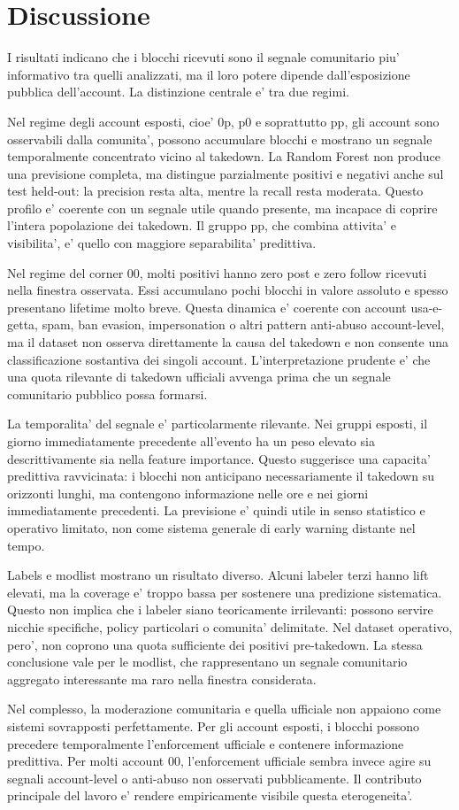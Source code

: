 \section{Discussione}

I risultati indicano che i blocchi ricevuti sono il segnale comunitario piu' informativo tra quelli analizzati, ma il loro potere dipende dall'esposizione pubblica dell'account. La distinzione centrale e' tra due regimi.

Nel regime degli account esposti, cioe' 0p, p0 e soprattutto pp, gli account sono osservabili dalla comunita', possono accumulare blocchi e mostrano un segnale temporalmente concentrato vicino al takedown. La Random Forest non produce una previsione completa, ma distingue parzialmente positivi e negativi anche sul test held-out: la precision resta alta, mentre la recall resta moderata. Questo profilo e' coerente con un segnale utile quando presente, ma incapace di coprire l'intera popolazione dei takedown. Il gruppo pp, che combina attivita' e visibilita', e' quello con maggiore separabilita' predittiva.

Nel regime del corner 00, molti positivi hanno zero post e zero follow ricevuti nella finestra osservata. Essi accumulano pochi blocchi in valore assoluto e spesso presentano lifetime molto breve. Questa dinamica e' coerente con account usa-e-getta, spam, ban evasion, impersonation o altri pattern anti-abuso account-level, ma il dataset non osserva direttamente la causa del takedown e non consente una classificazione sostantiva dei singoli account. L'interpretazione prudente e' che una quota rilevante di takedown ufficiali avvenga prima che un segnale comunitario pubblico possa formarsi.

La temporalita' del segnale e' particolarmente rilevante. Nei gruppi esposti, il giorno immediatamente precedente all'evento ha un peso elevato sia descrittivamente sia nella feature importance. Questo suggerisce una capacita' predittiva ravvicinata: i blocchi non anticipano necessariamente il takedown su orizzonti lunghi, ma contengono informazione nelle ore e nei giorni immediatamente precedenti. La previsione e' quindi utile in senso statistico e operativo limitato, non come sistema generale di early warning distante nel tempo.

Labels e modlist mostrano un risultato diverso. Alcuni labeler terzi hanno lift elevati, ma la coverage e' troppo bassa per sostenere una predizione sistematica. Questo non implica che i labeler siano teoricamente irrilevanti: possono servire nicchie specifiche, policy particolari o comunita' delimitate. Nel dataset operativo, pero', non coprono una quota sufficiente dei positivi pre-takedown. La stessa conclusione vale per le modlist, che rappresentano un segnale comunitario aggregato interessante ma raro nella finestra considerata.

Nel complesso, la moderazione comunitaria e quella ufficiale non appaiono come sistemi sovrapposti perfettamente. Per gli account esposti, i blocchi possono precedere temporalmente l'enforcement ufficiale e contenere informazione predittiva. Per molti account 00, l'enforcement ufficiale sembra invece agire su segnali account-level o anti-abuso non osservati pubblicamente. Il contributo principale del lavoro e' rendere empiricamente visibile questa eterogeneita'.
